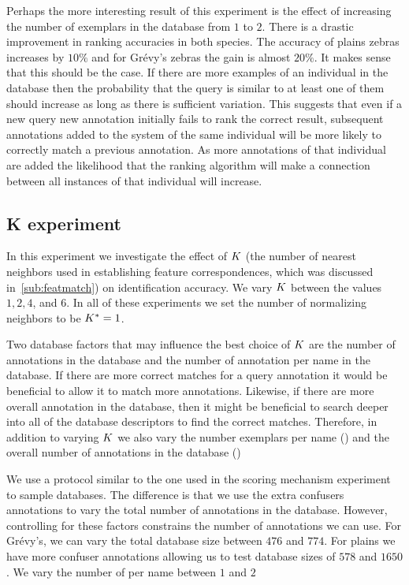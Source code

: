         Perhaps the more interesting result of this experiment is the effect of increasing the number of exemplars
        in the database from $1$ to $2$. There is a drastic improvement in ranking accuracies in both species. The
        accuracy of plains zebras increases by $10\percent$ and for Grévy's zebras the gain is almost $20\percent$.
        It makes sense that this should be the case. If there are more examples of an individual in the database
        then the probability that the query is similar to at least one of them should increase as long as there is
        sufficient variation. This suggests that even if a new query new annotation initially fails to rank the
        correct result, subsequent annotations added to the system of the same individual will be more likely to
        correctly match a previous annotation. As more annotations of that individual are added the likelihood that
        the ranking algorithm will make a connection between all instances of that individual will increase.

        \NScoreExpt{}


    \FloatBarrier{}
    \subsection{K experiment}\label{sub:exptk}  

        In this experiment we investigate the effect of $K$ (the number of nearest neighbors used in establishing
        feature correspondences, which was discussed in~\cref{sub:featmatch}) on identification accuracy. We vary
        $K$ between the values $1, 2, 4$, and $6$. In all of these experiments we set the number of normalizing
        neighbors to be $K^{*}=1$.

        Two database factors that may influence the best choice of $K$ are the number of annotations in the
        database and the number of annotation per name in the database. If there are more correct matches for a
        query annotation it would be beneficial to allow it to match more annotations. Likewise, if there are more
        overall annotation in the database, then it might be beneficial to search deeper into all of the database
        descriptors to find the correct matches. Therefore, in addition to varying $K$ we also vary the number
        exemplars per name () and the overall number of annotations in the database ()

        We use a protocol similar to the one used in the scoring mechanism experiment to sample databases. The
        difference is that we use the extra confusers annotations to vary the total number of annotations in the
        database. However, controlling for these factors constrains the number of annotations we can use. For
        Grévy's, we can vary the total database size between $476$ and $774$. For plains we have more confuser
        annotations allowing us to test database sizes of $578$ and $1650$. We vary the number of \exemplars{} per
        name between $1$ and $2$

